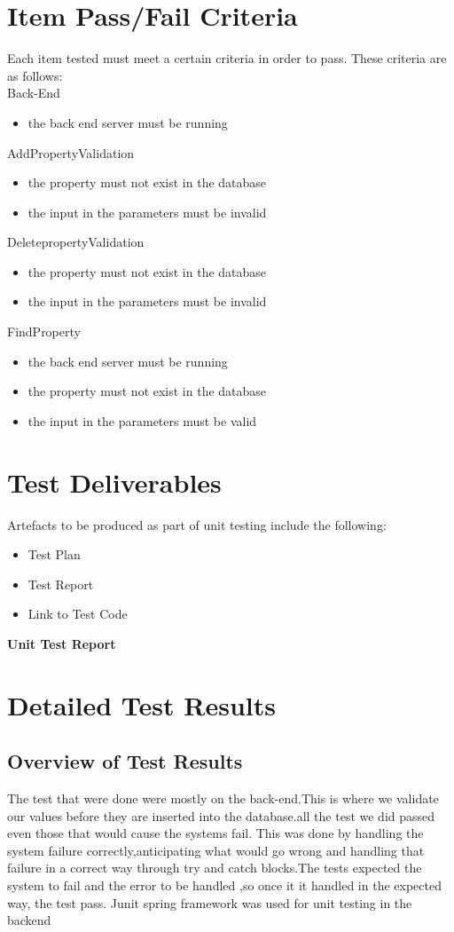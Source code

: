\documentclass[a4paper,12pt]{article}
\begin{document}
\section{Item Pass/Fail Criteria}
Each item tested must meet a certain criteria in order to pass. These criteria are as follows:\\
Back-End
\begin{itemize}
 \item the back end server must be running
\end{itemize}
AddPropertyValidation
\begin{itemize}
 \item the property must not exist in the database
 \item the input in the parameters must be invalid
\end{itemize}
DeletepropertyValidation
\begin{itemize}
 \item the property must not exist in the database
 \item the input in the parameters must be invalid
\end{itemize}
FindProperty
\begin{itemize}
 \item the back end server must be running
 \item the property must not exist in the database
 \item the input in the parameters must be valid
\end{itemize}
\section{Test Deliverables}
Artefacts to be produced as part of unit testing include the following:
\begin{itemize}
\item Test Plan
\item Test Report
\item Link to Test Code
\end{itemize}

\newpage
\begin{center}
{\huge \bfseries Unit Test Report}\\[0.5cm]
\end{center}
\section{Detailed Test Results}
\subsection{Overview of Test Results}
The test that were done were mostly on the back-end.This is where we validate our values before they are inserted into the database.all the test we did passed even those that would cause the systems fail. This was done by handling the system failure correctly,anticipating what would go wrong and handling that failure in a correct way through try and catch blocks.The tests expected the system to fail and the error to be handled ,so once it it handled in the expected way, the test pass. Junit spring framework was used for unit testing in the backend 
\end{document}
